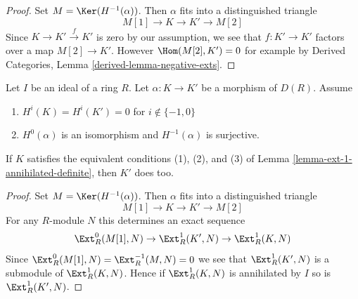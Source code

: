 \begin{proof}
Set $M = \Ker(H^{-1}(\alpha))$. Then $\alpha$ fits into a distinguished
triangle
$$
M[1] \to K \to K' \to M[2]
$$
Since $K \to K' \xrightarrow{f} K'$ is zero by our assumption, we see
that $f : K' \to K'$ factors over a map $M[2] \to K'$. However
$\Hom(M[2], K') = 0$ for example by
Derived Categories, Lemma \ref{derived-lemma-negative-exts}.
\end{proof}

\begin{lemma}
\label{lemma-surjection-property-ext-1-annihilated}
Let $I$ be an ideal of a ring $R$. Let $\alpha : K \to K'$
be a morphism of $D(R)$. Assume
\begin{enumerate}
\item $H^i(K) = H^i(K') = 0$ for $i \not \in \{-1, 0\}$
\item $H^0(\alpha)$ is an isomorphism and $H^{-1}(\alpha)$ is surjective.
\end{enumerate}
If $K$ satisfies the equivalent conditions (1), (2), and (3)
of Lemma \ref{lemma-ext-1-annihilated-definite},
then $K'$ does too.
\end{lemma}

\begin{proof}
Set $M = \Ker(H^{-1}(\alpha))$. Then $\alpha$ fits into a distinguished
triangle
$$
M[1] \to K \to K' \to M[2]
$$
For any $R$-module $N$ this determines an exact sequence
$$
\Ext^0_R(M[1], N) \to
\Ext^1_R(K', N) \to
\Ext^1_R(K, N)
$$
Since $\Ext^0_R(M[1], N) = \Ext^{-1}_R(M, N) = 0$ we see that
$\Ext^1_R(K', N)$ is a submodule of $\Ext^1_R(K, N)$. Hence if
$\Ext^1_R(K, N)$ is annihilated by $I$ so is $\Ext^1_R(K', N)$.
\end{proof}

